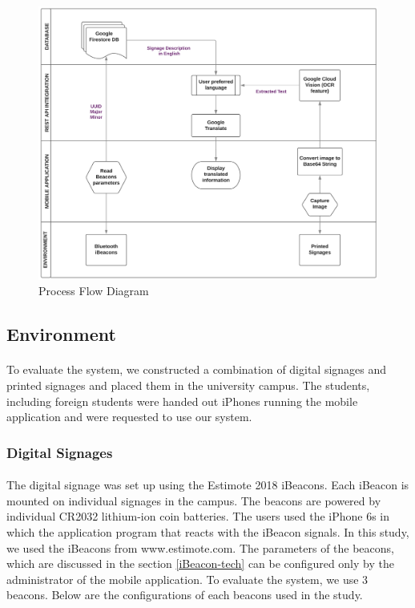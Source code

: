 \documentclass[12pt]{article}
\begin{document}
\begin{figure}[H]
	\centering
	\includegraphics[width=1\linewidth]{media/Architecture-3.png}
	\caption{Process Flow Diagram}
	\label{fig:system}
\end{figure} 

\subsection{Environment}
\label{env}
\paragraph{}To evaluate the system, we constructed a combination of digital signages and printed signages and placed them in the university campus. The students, including foreign students were handed out iPhones running the mobile application and were requested to use our system.

\subsubsection{Digital Signages}
\paragraph{}The digital signage was set up using the Estimote 2018 iBeacons. Each iBeacon is mounted on individual signages in the campus. The beacons are powered by individual CR2032 lithium-ion coin batteries. The users used the iPhone 6s in which the application program that reacts with the iBeacon signals. In this study, we used the iBeacons from www.estimote.com. The parameters of the beacons, which are discussed in the section \ref{iBeacon-tech} can be configured only by the administrator of the mobile application. To evaluate the system, we use 3 beacons. Below are the configurations of each beacons used in the study.
\end{document}
